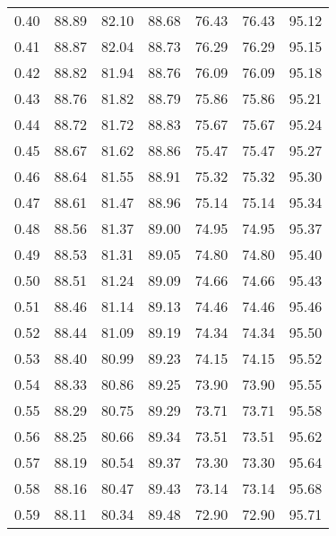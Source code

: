 \begin{tabular}{|c|c|c|c|c|c|c|}
      0.40 &     88.89 &     82.10 &      88.68 &   76.43 &      76.43 &         95.12 \\
      0.41 &     88.87 &     82.04 &      88.73 &   76.29 &      76.29 &         95.15 \\
      0.42 &     88.82 &     81.94 &      88.76 &   76.09 &      76.09 &         95.18 \\
      0.43 &     88.76 &     81.82 &      88.79 &   75.86 &      75.86 &         95.21 \\
      0.44 &     88.72 &     81.72 &      88.83 &   75.67 &      75.67 &         95.24 \\
      0.45 &     88.67 &     81.62 &      88.86 &   75.47 &      75.47 &         95.27 \\
      0.46 &     88.64 &     81.55 &      88.91 &   75.32 &      75.32 &         95.30 \\
      0.47 &     88.61 &     81.47 &      88.96 &   75.14 &      75.14 &         95.34 \\
      0.48 &     88.56 &     81.37 &      89.00 &   74.95 &      74.95 &         95.37 \\
      0.49 &     88.53 &     81.31 &      89.05 &   74.80 &      74.80 &         95.40 \\
      0.50 &     88.51 &     81.24 &      89.09 &   74.66 &      74.66 &         95.43 \\
      0.51 &     88.46 &     81.14 &      89.13 &   74.46 &      74.46 &         95.46 \\
      0.52 &     88.44 &     81.09 &      89.19 &   74.34 &      74.34 &         95.50 \\
      0.53 &     88.40 &     80.99 &      89.23 &   74.15 &      74.15 &         95.52 \\
      0.54 &     88.33 &     80.86 &      89.25 &   73.90 &      73.90 &         95.55 \\
      0.55 &     88.29 &     80.75 &      89.29 &   73.71 &      73.71 &         95.58 \\
      0.56 &     88.25 &     80.66 &      89.34 &   73.51 &      73.51 &         95.62 \\
      0.57 &     88.19 &     80.54 &      89.37 &   73.30 &      73.30 &         95.64 \\
      0.58 &     88.16 &     80.47 &      89.43 &   73.14 &      73.14 &         95.68 \\
      0.59 &     88.11 &     80.34 &      89.48 &   72.90 &      72.90 &         95.71 \\

\end{tabular}
